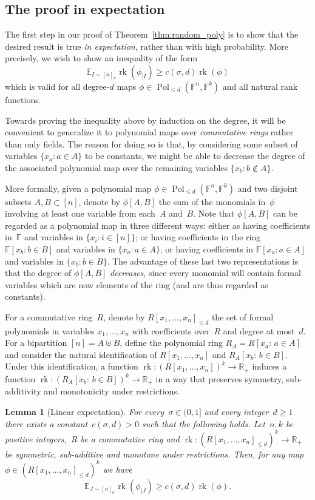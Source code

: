 \documentclass[10pt]{article}
\newtheorem{lemma}[theorem]{Lemma}
\newcommand{\Exp}{{\mathbb{E}}}
\newcommand{\R}{\mathbb{R}}
\newcommand{\F}{\mathbb{F}}
\newcommand{\1}{\mathbf{1}}
\newcommand{\st}{:\,}
\DeclareMathOperator{\rank}{rk}
\DeclareMathOperator{\Pol}{Pol}
\newcommand{\beqn}{\begin{equation*}}
\newcommand{\eeqn}{\end{equation*}}
\begin{document}
\subsection{The proof in expectation}

The first step in our proof of Theorem~\ref{thm:random_poly} is to show that the desired result is true \emph{in expectation}, rather than with high probability.
More precisely, we wish to show an inequality of the form
\beqn
\Exp_{I\sim [n]_{\sigma}} \rank(\phi_{|I}) \geq c(\sigma, d) \rank(\phi)
\eeqn
which is valid for all degree-$d$ maps $\phi\in \Pol_{\leq d}(\F^n, \F^k)$ and all natural rank functions.

Towards proving the inequality above by induction on the degree, it will be convenient to generalize it to polynomial maps over \emph{commutative rings} rather than only fields.
The reason for doing so is that, by considering some subset of variables $\{x_a: a\in A\}$ to be constants, we might be able to decrease the degree of the associated polynomial map over the remaining variables $\{x_b: b\notin A\}$.

More formally, given a polynomial map $\phi\in \Pol_{\leq d}(\F^n, \F^k)$ and two disjoint subsets $A, B \subset [n]$, denote by $\phi[A, B]$ the sum of the monomials in~$\phi$ involving at least one variable from each~$A$ and~$B$.
Note that $\phi[A, B]$ can be regarded as a polynomial map in three different ways:
either as having coefficients in~$\F$ and variables in $\{x_i: i\in [n]\}$;
or having coefficients in the ring $\F[x_b: b\in B]$ and variables in $\{x_a: a\in A\}$;
or having coefficients in $\F[x_a: a\in A]$ and variables in $\{x_b: b\in B\}$.
The advantage of these last two representations is that the degree of $\phi[A, B]$ \emph{decreases}, since every monomial will contain formal variables which are now elements of the ring (and are thus regarded as constants).

For a commutative ring~$R$, denote by $R[x_1, \dots, x_n]_{\leq d}$ the set of formal polynomials in variables $x_1, \dots, x_n$ with coefficients over~$R$ and degree at most~$d$.
For a bipartition $[n] = A\uplus B$, define the polynomial ring $R_A = R[x_a\st a\in A]$ and consider the natural identification of $R[x_1,\dots,x_n]$ and $R_A[x_b\st b\in B]$.
Under this identification, a function $\rank: (R[x_1, \dots, x_n])^k \to \R_+$ induces a function $\rank:(R_A[x_b\st b\in B])^k\to \R_+$ in a way that preserves symmetry, sub-additivity and monotonicity under restrictions.


\begin{lemma}[Linear expectation] \label{lem:expectation}
For every~$\sigma\in (0, 1]$ and every integer~$d \geq 1$ there exists a constant~$c(\sigma, d) > 0$ such that the following holds.
Let~$n,k$ be positive integers,~$R$ be a commutative ring and $\rank: (R[x_1, \dots, x_n]_{\leq d})^k \to \R_+$ be symmetric, sub-additive and monotone under restrictions.
Then, for any map $\phi\in (R[x_1, \dots, x_n]_{\leq d})^k$ we have
\beqn
\Exp_{J\sim [n]_{\sigma}} \rank(\phi_{|J}) \geq c(\sigma, d) \rank(\phi).
\eeqn
\end{lemma}
\end{document}
